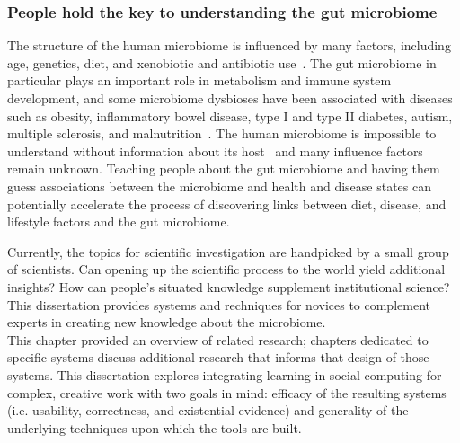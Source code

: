 \subsubsection{People hold the key to understanding the gut microbiome}
The structure of the human microbiome is influenced by many factors, including age, genetics, diet, and xenobiotic and antibiotic use~\cite{Gill2006}. The gut microbiome in particular plays an important role in metabolism and immune system development, and some microbiome dysbioses have been associated with diseases such as obesity, inflammatory bowel disease, type I and type II diabetes, autism, multiple sclerosis, and malnutrition~\cite{Cho2012}. The human microbiome is impossible to understand without information about its host~\cite{Debelius2016} and many influence factors remain unknown. Teaching people about the gut microbiome and having them guess associations between the microbiome and health and disease states can potentially accelerate the process of discovering links between diet, disease, and lifestyle factors and the gut microbiome.

Currently, the topics for scientific investigation are handpicked
by a small group of scientists. Can opening up the
scientific process to the world yield additional insights?
How can people’s situated knowledge supplement institutional
science? This dissertation provides systems and rechniques for novices to complement experts in creating new knowledge about the microbiome. \\


This chapter provided an overview of related research; chapters dedicated to specific systems discuss additional research that informs that design of those systems. This dissertation explores integrating learning in social computing for complex, creative work with two goals in mind: efficacy of the resulting systems (i.e. usability, correctness, and existential evidence) and generality of the underlying techniques upon which the tools are built.